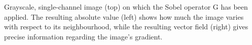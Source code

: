 Grayscale, single-channel image (top) on which the Sobel operator G has been
applied. The resulting absolute value (left) shows how much the image varies with respect to
its neighbourhood, while the resulting vector field (right) gives precise information regarding
the image’s gradient.
